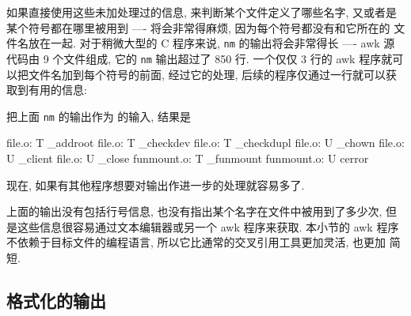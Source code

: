 如果直接使用这些未加处理过的信息, 来判断某个文件定义了哪些名字, 又或者是
某个符号都在哪里被用到 ---- 将会非常得麻烦, 因为每个符号都没有和它所在的
文件名放在一起. 对于稍微大型的 C 程序来说, \verb'nm' 的输出将会非常得长
---- awk 源代码由 9 个文件组成, 它的 \verb'nm' 输出超过了 850 行.
一个仅仅 3 行的 awk 程序就可以把文件名加到每个符号的前面, 经过它的处理,
后续的程序仅通过一行就可以获取到有用的信息:
把上面 \verb'nm' 的输出作为  的输入, 结果是
\begin{awkcode}
    file.o: T _addroot
    file.o: T _checkdev
    file.o: T _checkdupl
    file.o: U _chown
    file.o: U _client
    file.o: U _close
    funmount.o: T _funmount
    funmount.o: U cerror
\end{awkcode}
现在, 如果有其他程序想要对输出作进一步的处理就容易多了.

上面的输出没有包括行号信息, 也没有指出某个名字在文件中被用到了多少次, 
但是这些信息很容易通过文本编辑器或另一个 awk 程序来获取. 本小节的 awk 程序 
不依赖于目标文件的编程语言, 所以它比通常的交叉引用工具更加灵活, 也更加
简短.

\subsection{格式化的输出}
\label{subsec:formatted_output}

